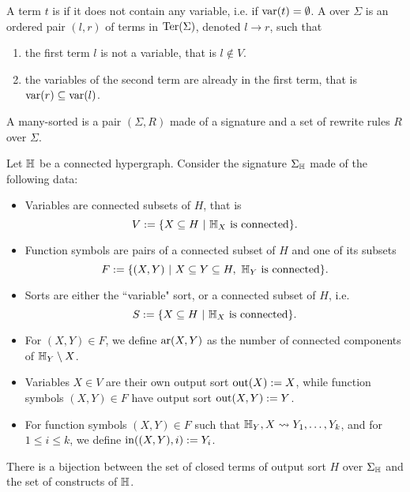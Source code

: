 A term $t$ is  if it does not contain any variable, i.e. if $\operatorname{var}(t)=\emptyset$.
A  over $\Sigma$ is an ordered pair $(l,r)$ of terms in $\operatorname{Ter}(\Sigma)$, denoted $l \to r$, such that
\begin{enumerate}
  \item the first term $l$ is not a variable, that is $l \notin V$.
  \item the variables of the second term are already in the first term, that is $\operatorname{var}(r) \subseteq \operatorname{var}(l)$.
\end{enumerate}

\begin{definition}
  A many-sorted  is a pair $(\Sigma,R)$ made of a signature and a set of rewrite rules $R$ over $\Sigma$.
\end{definition}

\begin{definition} \label{def:signature-hyper}
  Let ${\mathbb H}$ be a connected hypergraph. 
Consider the signature $\Sigma_{\mathbb H}$ made of the following data: 
\begin{itemize}
  \item Variables are connected subsets of $H$, that is $$V:=\{ X \subseteq H \ | \ \hyper{H}_{X} \text{ is connected}\}.$$ 
  \item Function symbols are pairs of a connected subset of $H$ and one of its subsets 
  $$F:=\{(X,Y) \ | \ X \subseteq Y \subseteq H, \ {\mathbb H}_Y \text{ is connected}\}.$$
  \item Sorts are either the ``variable" sort, or a connected subset of $H$, i.e. 
  $$S:=\{ X \subseteq H \ | \ {\mathbb H}_X \text{ is connected}\}.$$
  \item For $(X,Y) \in F$, we define $\mathrm{ar}(X,Y)$ as the number of connected components of ${\mathbb H}_Y\setminus X$.
  \item Variables $X \in V$ are their own output sort $\operatorname{out}(X):=X$, while function symbols $(X,Y) \in F$ have output sort $\operatorname{out}(X,Y):=Y$.
  \item For function symbols $(X,Y) \in F$ such that ${\mathbb H}_Y,X \leadsto Y_1,\ldots,Y_k$, and for $1 \leq i \leq k$, we define $\operatorname{in}((X,Y),i):=Y_i$.
\end{itemize}
\end{definition}


\begin{lemma} \label{l:bijection-terms}
  There is a bijection between the set of closed terms of output sort $H$ over $\Sigma_{\mathbb H}$ and the set of constructs of ${\mathbb H}$.
\end{lemma}

